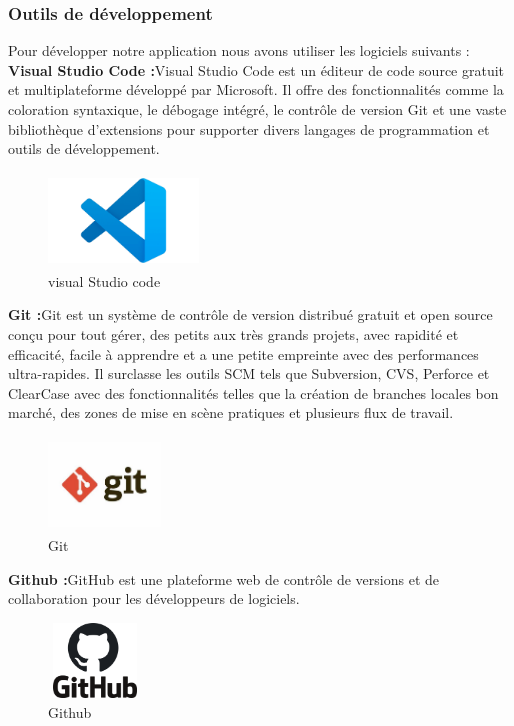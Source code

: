 \documentclass[edit,12pt,a4paper,ChapStyle,oneside,doubleinterligne]{report}
\begin{document}
\subsubsection{Outils de développement }
Pour développer notre application nous avons utiliser les logiciels suivants :
\newline\textbf {Visual Studio Code :}Visual Studio Code est un éditeur de code source gratuit et multiplateforme développé par Microsoft. Il offre des fonctionnalités comme la coloration syntaxique, le débogage intégré, le contrôle de version Git et une vaste bibliothèque d'extensions pour supporter divers langages de programmation et outils de développement.\cite{vscode}
\begin{figure}[H]\label{fig:vscode}
    \centering
    \includegraphics[width=4cm , height = 2.5cm , angle=360]{images/vscode.png}
    \caption{visual Studio code}
    \end{figure}
\textbf {Git :}Git est un système de contrôle de version distribué gratuit et open source conçu pour tout gérer, des petits aux très grands projets, avec rapidité et efficacité, facile à apprendre et a une petite empreinte avec des performances ultra-rapides. Il surclasse les outils SCM tels que Subversion, CVS, Perforce et ClearCase avec des fonctionnalités telles que la création de branches locales bon marché, des zones de mise en scène pratiques et plusieurs flux de travail. \cite{git}
\begin{figure}[H]
    \centering
    \includegraphics[width=3cm , height = 2.5cm , angle=360]{images/git.jpg}
    \caption{Git}
    \label{fig:git}
\end{figure}
  \textbf {Github  :}GitHub est une plateforme web de contrôle de versions et de collaboration pour les développeurs de logiciels. \cite{github}
  \begin{figure} [H]
    \centering
    \includegraphics[width=2.5cm , height = 2cm , angle=360]{images/github.png}
    \caption{Github}
    \label{fig:github}
\end{figure}
\end{document}
